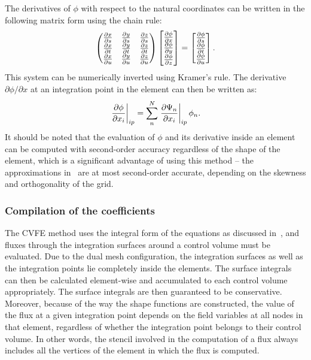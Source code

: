 The derivatives of $\phi$ with respect to the natural coordinates can be written in the following matrix form using the chain rule:
\begin{equation*}
    \begin{pmatrix}
         \frac{\partial x}{\partial s}  &  \frac{\partial y}{\partial s}  &  \frac{\partial z}{\partial s}  \\
         \frac{\partial x}{\partial t}  &  \frac{\partial y}{\partial t}  &  \frac{\partial z}{\partial t}  \\
         \frac{\partial x}{\partial u}  &  \frac{\partial y}{\partial u}  &  \frac{\partial z}{\partial u} 
    \end{pmatrix}
    \begin{bmatrix}
         \frac{\partial \phi}{\partial x}  \\
         \frac{\partial \phi}{\partial y}  \\
         \frac{\partial \phi}{\partial z} 
    \end{bmatrix}
    =
    \begin{bmatrix}
         \frac{\partial \phi}{\partial s}  \\
         \frac{\partial \phi}{\partial t}  \\
         \frac{\partial \phi}{\partial u} 
    \end{bmatrix}.
\end{equation*}
This system can be numerically inverted using Kramer's rule.
The derivative $\partial \phi/\partial x$ at an integration point in the element can then be written as:
\begin{equation*}
    \left. \frac{\partial \phi}{\partial x_i} \right|_{ip} = \sum_n^N \left. \frac{\partial \Psi_n}{\partial x_i} \right|_{ip}\phi_n.
\end{equation*}
It should be noted that the evaluation of $\phi$ and its derivative inside an element can be computed with second-order accuracy regardless of the shape of the element, which is a significant advantage of using this method -- the approximations in~ are at most second-order accurate, depending on the skewness and orthogonality of the grid.


\subsubsection{Compilation of the coefficients}
The CVFE method uses the integral form of the equations as discussed in~, and fluxes through the integration surfaces around a control volume must be evaluated. Due to the dual mesh configuration, the integration surfaces as well as the integration points lie completely inside the elements. The surface integrals can then be calculated element-wise and accumulated to each control volume appropriately. The surface integrals are then guaranteed to be conservative. Moreover, because of the way the shape functions are constructed, the value of the flux at a given integration point depends on the field variables at all nodes in that element, regardless of whether the integration point belongs to their control volume. In other words, the stencil involved in the computation of a flux always includes all the vertices of the element in which the flux is computed.

